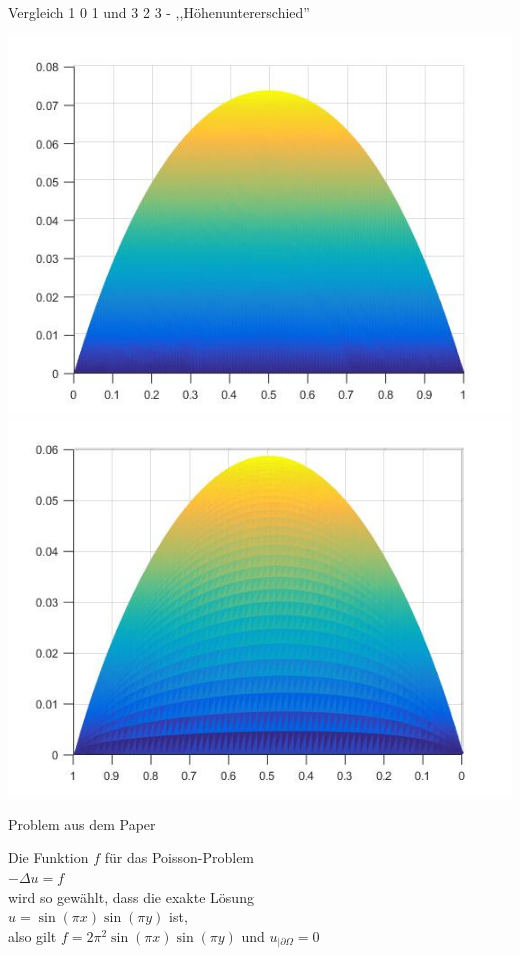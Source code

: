 \documentclass[xcolor=svgnames,ngerman]{beamer}
\begin{document}
				\begin{frame}{Vergleich 1 0 1 und 3 2 3 - ,,Höhenuntererschied''}
\begin{center}
	\includegraphics[scale=0.3]{solution2.jpg}
	\includegraphics[scale=0.3]{figureweird.jpg}
\end{center}
	\end{frame}	
	
\begin{frame}{Problem aus dem Paper}
\begin{center}
Die Funktion $f$ für das Poisson-Problem \\
$-\Delta u =f$ \\
wird so gewählt, dass die exakte Lösung\\
 $u=\sin (\pi x) \sin (\pi y)$ 
 ist, \\
 also gilt 
 $f=2\pi ^2 \sin (\pi x) \sin (\pi y)$ und  $u_{|\partial \Omega}=0  $
\end{center}
\end{frame}	
\end{document}
